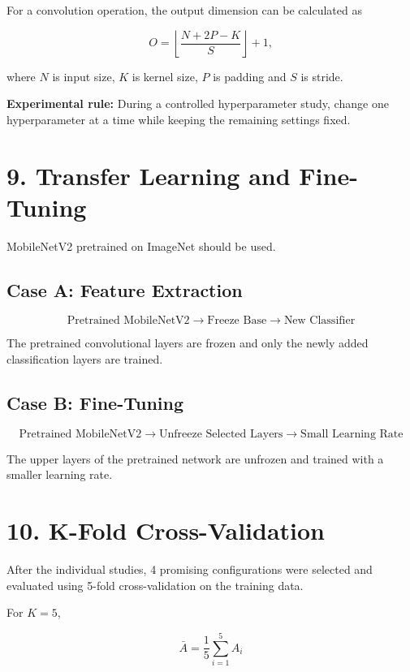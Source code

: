 \documentclass[10pt]{article}
\begin{document}
For a convolution operation, the output dimension can be calculated as

\[
O=
\left\lfloor
\frac{N+2P-K}{S}
\right\rfloor+1,
\]

where $N$ is input size, $K$ is kernel size, $P$ is padding and $S$ is
stride.

\textbf{Experimental rule:} During a controlled hyperparameter study,
change one hyperparameter at a time while keeping the remaining settings
fixed.

\section*{9. Transfer Learning and Fine-Tuning}

MobileNetV2 pretrained on ImageNet should be used.

\subsection*{Case A: Feature Extraction}

\[
\text{Pretrained MobileNetV2}
\rightarrow
\text{Freeze Base}
\rightarrow
\text{New Classifier}
\]

The pretrained convolutional layers are frozen and only the newly added
classification layers are trained.

\subsection*{Case B: Fine-Tuning}

\[
\text{Pretrained MobileNetV2}
\rightarrow
\text{Unfreeze Selected Layers}
\rightarrow
\text{Small Learning Rate}
\]

The upper layers of the pretrained network are unfrozen and trained with
a smaller learning rate.

\section*{10. K-Fold Cross-Validation}

After the individual studies, 4 promising configurations were selected and evaluated using 5-fold cross-validation on the training data.

For $K=5$,

\[
\bar{A}=
\frac{1}{5}\sum_{i=1}^{5}A_i
\]
\end{document}
